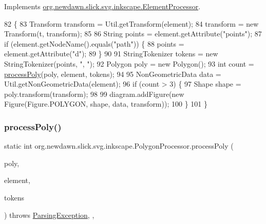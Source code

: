 Implements \mbox{\hyperlink{interfaceorg_1_1newdawn_1_1slick_1_1svg_1_1inkscape_1_1_element_processor_acd170a9e1119481edae885780db59a2e}{org.\+newdawn.\+slick.\+svg.\+inkscape.\+Element\+Processor}}.


\begin{DoxyCode}
82                                                                                                            
         \{
83         Transform transform = Util.getTransform(element);
84         transform = \textcolor{keyword}{new} Transform(t, transform); 
85         
86         String points = element.getAttribute(\textcolor{stringliteral}{"points"});
87         \textcolor{keywordflow}{if} (element.getNodeName().equals(\textcolor{stringliteral}{"path"})) \{
88             points = element.getAttribute(\textcolor{stringliteral}{"d"});
89         \}
90         
91         StringTokenizer tokens = \textcolor{keyword}{new} StringTokenizer(points, \textcolor{stringliteral}{", "});
92         Polygon poly = \textcolor{keyword}{new} Polygon();
93         \textcolor{keywordtype}{int} count = \mbox{\hyperlink{classorg_1_1newdawn_1_1slick_1_1svg_1_1inkscape_1_1_polygon_processor_ac886c9f2c9de6f293db4158e6161b42a}{processPoly}}(poly, element, tokens);
94         
95         NonGeometricData data = Util.getNonGeometricData(element);
96         \textcolor{keywordflow}{if} (count > 3) \{
97             Shape shape = poly.transform(transform);
98             
99             diagram.addFigure(\textcolor{keyword}{new} Figure(Figure.POLYGON, shape, data, transform));
100         \} 
101     \}
\end{DoxyCode}
\mbox{\label{classorg_1_1newdawn_1_1slick_1_1svg_1_1inkscape_1_1_polygon_processor_ac886c9f2c9de6f293db4158e6161b42a}} 
\subsubsection{\texorpdfstring{process\+Poly()}{processPoly()}}
{\footnotesize\ttfamily static int org.\+newdawn.\+slick.\+svg.\+inkscape.\+Polygon\+Processor.\+process\+Poly (\begin{DoxyParamCaption}\item[{\mbox{\hyperlink{classorg_1_1newdawn_1_1slick_1_1geom_1_1_polygon}{Polygon}}}]{poly,  }\item[{Element}]{element,  }\item[{String\+Tokenizer}]{tokens }\end{DoxyParamCaption}) throws \mbox{\hyperlink{classorg_1_1newdawn_1_1slick_1_1svg_1_1_parsing_exception}{Parsing\+Exception}}\hspace{0.3cm}{\ttfamily [inline]}, {\ttfamily [static]}, {\ttfamily [private]}}

